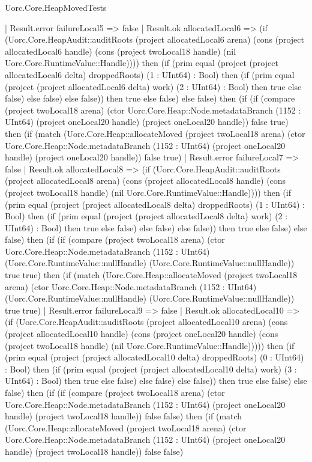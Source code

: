\begin{lexlean}{Uorc.Core.HeapMovedTests}
\begin{semanticmodule}
{        | Result.error failureLocal5 => false
        | Result.ok allocatedLocal6 => (if (Uorc.Core.HeapAudit::auditRoots (project allocatedLocal6 arena) (cons (project allocatedLocal6 handle) (cons (project twoLocal18 handle) (nil Uorc.Core.RuntimeValue::Handle)))) then (if (prim equal (project (project allocatedLocal6 delta) droppedRoots) (1 : UInt64) : Bool) then (if (prim equal (project (project allocatedLocal6 delta) work) (2 : UInt64) : Bool) then true else false) else false) else false)) then true else false) else false) then (if (if (compare (project twoLocal18 arena) (ctor Uorc.Core.Heap::Node.metadataBranch (1152 : UInt64) (project oneLocal20 handle) (project oneLocal20 handle)) false true) then (if (match (Uorc.Core.Heap::allocateMoved (project twoLocal18 arena) (ctor Uorc.Core.Heap::Node.metadataBranch (1152 : UInt64) (project oneLocal20 handle) (project oneLocal20 handle)) false true)
        | Result.error failureLocal7 => false
        | Result.ok allocatedLocal8 => (if (Uorc.Core.HeapAudit::auditRoots (project allocatedLocal8 arena) (cons (project allocatedLocal8 handle) (cons (project twoLocal18 handle) (nil Uorc.Core.RuntimeValue::Handle)))) then (if (prim equal (project (project allocatedLocal8 delta) droppedRoots) (1 : UInt64) : Bool) then (if (prim equal (project (project allocatedLocal8 delta) work) (2 : UInt64) : Bool) then true else false) else false) else false)) then true else false) else false) then (if (if (compare (project twoLocal18 arena) (ctor Uorc.Core.Heap::Node.metadataBranch (1152 : UInt64) (Uorc.Core.RuntimeValue::nullHandle) (Uorc.Core.RuntimeValue::nullHandle)) true true) then (if (match (Uorc.Core.Heap::allocateMoved (project twoLocal18 arena) (ctor Uorc.Core.Heap::Node.metadataBranch (1152 : UInt64) (Uorc.Core.RuntimeValue::nullHandle) (Uorc.Core.RuntimeValue::nullHandle)) true true)
        | Result.error failureLocal9 => false
        | Result.ok allocatedLocal10 => (if (Uorc.Core.HeapAudit::auditRoots (project allocatedLocal10 arena) (cons (project allocatedLocal10 handle) (cons (project oneLocal20 handle) (cons (project twoLocal18 handle) (nil Uorc.Core.RuntimeValue::Handle))))) then (if (prim equal (project (project allocatedLocal10 delta) droppedRoots) (0 : UInt64) : Bool) then (if (prim equal (project (project allocatedLocal10 delta) work) (3 : UInt64) : Bool) then true else false) else false) else false)) then true else false) else false) then (if (if (compare (project twoLocal18 arena) (ctor Uorc.Core.Heap::Node.metadataBranch (1152 : UInt64) (project oneLocal20 handle) (project twoLocal18 handle)) false false) then (if (match (Uorc.Core.Heap::allocateMoved (project twoLocal18 arena) (ctor Uorc.Core.Heap::Node.metadataBranch (1152 : UInt64) (project oneLocal20 handle) (project twoLocal18 handle)) false false)
}
\end{semanticmodule}
\end{lexlean}
